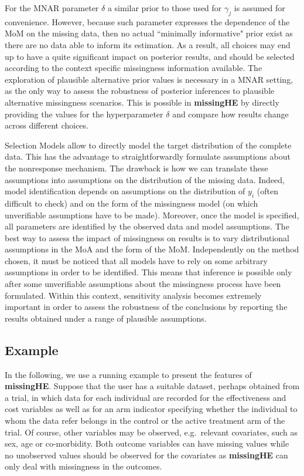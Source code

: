\documentclass[]{article}
\begin{document}
For the MNAR parameter \(\delta\) a similar prior to those used for
\(\gamma_{j}\) is assumed for convenience. However, because such
parameter expresses the dependence of the MoM on the missing data, then
no actual ``minimally informative" prior exist as there are no data able
to inform its estimation. As a result, all choices may end up to have a
quite significant impact on posterior results, and should be selected
according to the context specific missingness information available. The
exploration of plausible alternative prior values is necessary in a MNAR
setting, as the only way to assess the robustness of posterior
inferences to plausible alternative missingness scenarios. This is
possible in \textbf{missingHE} by directly providing the values for the
hyperparameter \(\delta\) and compare how results change across
different choices.

Selection Models allow to directly model the target distribution of the
complete data. This has the advantage to straightforwardly formulate
assumptions about the nonresponse mechanism. The drawback is how we can
translate these assumptions into assumptions on the distribution of the
missing data. Indeed, model identification depends on assumptions on the
distribution of \(y_{i}\) (often difficult to check) and on the form of
the missingness model (on which unverifiable assumptions have to be
made). Moreover, once the model is specified, all parameters are
identified by the observed data and model assumptions. The best way to
assess the impact of missingness on results is to vary distributional
assumptions in the MoA and the form of the MoM. Independently on the
method chosen, it must be noticed that all models have to rely on some
arbitrary assumptions in order to be identified. This means that
inference is possible only after some unverifiable assumptions about the
missingness process have been formulated. Within this context,
sensitivity analysis becomes extremely important in order to assess the
robustness of the conclusions by reporting the results obtained under a
range of plausible assumptions.

\subsection{\texorpdfstring{Example
\label{ex}}{Example }}\label{example}

In the following, we use a running example to present the features of
\textbf{missingHE}. Suppose that the user has a suitable dataset,
perhaps obtained from a trial, in which data for each individual are
recorded for the effectiveness and cost variables as well as for an arm
indicator specifying whether the individual to whom the data refer
belongs in the control or the active treatment arm of the trial. Of
course, other variables may be observed, e.g.~relevant covariates, such
as sex, age or co-morbidity. Both outcome variables can have missing
values while no unobserved values should be observed for the covariates
as \textbf{missingHE} can only deal with missingness in the outcomes.
\end{document}
